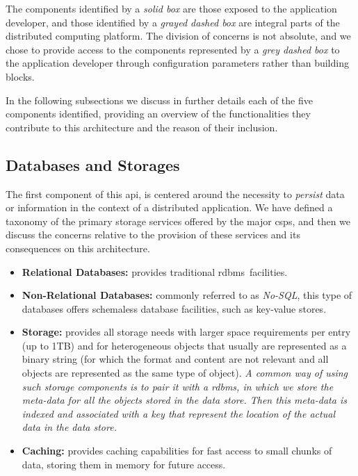 \documentclass[12pt, titlepage]{uo_temp}
\begin{document}
     The components identified by a \emph{solid box} are those exposed to the application
     developer, and those identified by a \emph{grayed dashed box} are integral parts of
     the distributed computing platform. The division of concerns is not absolute, and we
     chose to provide access to the components represented by a \emph{grey dashed box} to
     the application developer through configuration parameters rather than building
     blocks.

     In the following subsections we discuss in further details each of the five
     components identified, providing an overview of the functionalities they contribute
     to this architecture and the reason of their inclusion.

     \subsection{Databases and Storages}
     The first component of this \gls{api}, is centered around the necessity to
     \emph{persist} data or information in the context of a distributed application. We
     have defined a taxonomy of the primary storage services offered by the major
     \gls{csp}s, and then we discuss the concerns relative to the provision of these
     services and its consequences on this architecture.

     \begin{itemize}
       \item \textbf{Relational Databases:} provides traditional \gls{rdbms}\ facilities.
       \item \textbf{Non-Relational Databases:} commonly referred to as \emph{No-SQL}, this
         type of databases offers schemaless database facilities, such as key-value stores. 
       \item \textbf{Storage:} provides all storage needs with larger space requirements
         per entry (up to 1TB) and for heterogeneous objects that usually are represented
         as a binary string (for which the format and content are not relevant and all
         objects are represented as the same type of object). \emph{A common way of using such
         storage components is to pair it with a \gls{rdbms}, in which we store the
         meta-data for all the objects stored in the data store. Then this meta-data is
         indexed and associated with a key that represent the location of the actual data
         in the data store.}
       \item \textbf{Caching:} provides caching capabilities for fast access to small
         chunks of data, storing them in memory for future access.
     \end{itemize}
     
\end{document}
